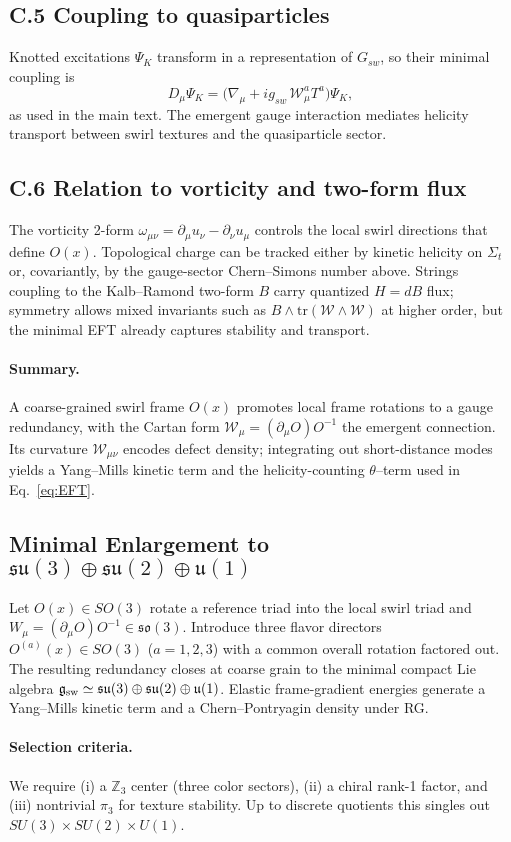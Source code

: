 \subsection*{C.5 Coupling to quasiparticles}
Knotted excitations \(\Psi_K\) transform in a representation of \(G_{\!sw}\), so their minimal coupling is
\[
    D_\mu\Psi_K=\big(\nabla_\mu + i g_{\!sw}\,\mathcal{W}_\mu^a T^a\big)\Psi_K,
\]
as used in the main text. The emergent gauge interaction mediates helicity transport between swirl textures and the quasiparticle sector.

\subsection*{C.6 Relation to vorticity and two-form flux}
The vorticity 2-form \(\omega_{\mu\nu}=\partial_\mu u_\nu-\partial_\nu u_\mu\) controls the local swirl directions that define \(O(x)\).
Topological charge can be tracked either by kinetic helicity on \(\Sigma_t\) or, covariantly, by the gauge-sector Chern–Simons number above. Strings coupling to the Kalb–Ramond two-form \(B\) carry quantized \(H=dB\) flux; symmetry allows mixed invariants such as \(B\wedge\mathrm{tr}(\mathcal{W}\wedge\mathcal{W})\) at higher order, but the minimal EFT already captures stability and transport.

\paragraph{Summary.}
A coarse-grained swirl frame \(O(x)\) promotes local frame rotations to a gauge redundancy, with the Cartan form \(\mathcal{W}_\mu=(\partial_\mu O)O^{-1}\) the emergent connection. Its curvature \(\mathcal{W}_{\mu\nu}\) encodes defect density; integrating out short-distance modes yields a Yang–Mills kinetic term and the helicity-counting \(\theta\)–term used in Eq.~\eqref{eq:EFT}.

\subsection{Minimal Enlargement to \texorpdfstring{$\mathfrak{su}(3)\oplus\mathfrak{su}(2)\oplus\mathfrak u(1)$}{su(3)+su(2)+u(1)}}
Let \(O(x)\in SO(3)\) rotate a reference triad into the local swirl triad and \(W_\mu=(\partial_\mu O)O^{-1}\in\mathfrak{so}(3)\).
Introduce three flavor directors \(O^{(a)}(x)\in SO(3)\) (\(a=1,2,3\)) with a common overall rotation factored out.
The resulting redundancy closes at coarse grain to the minimal compact Lie algebra
\(\mathfrak g_{\rm sw}\simeq \mathfrak{su}(3)\oplus\mathfrak{su}(2)\oplus\mathfrak u(1)\).
Elastic frame-gradient energies generate a Yang--Mills kinetic term and a Chern--Pontryagin density under RG.

\paragraph{Selection criteria.}
We require (i) a \(\mathbb Z_3\) center (three color sectors), (ii) a chiral rank-1 factor, and (iii) nontrivial \(\pi_3\) for texture stability.
Up to discrete quotients this singles out \(SU(3)\times SU(2)\times U(1)\).
